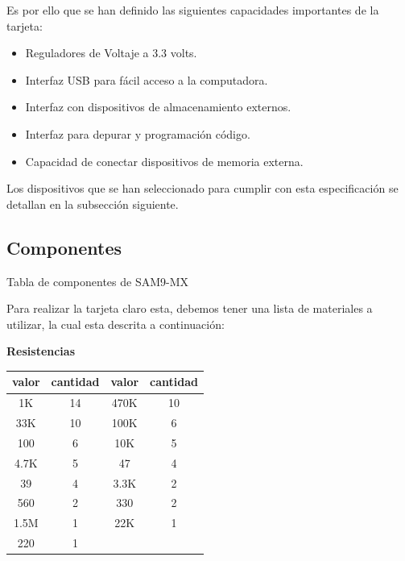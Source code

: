 Es por ello que se han definido las siguientes capacidades importantes de la tarjeta:

\begin{itemize}

\item Reguladores de Voltaje a 3.3 volts.
\item Interfaz USB para f\'acil acceso a la computadora.
\item Interfaz con dispositivos de almacenamiento externos.
\item Interfaz para depurar y programaci\'on código.
\item Capacidad de conectar dispositivos de memoria externa.

\end{itemize}

Los dispositivos que se han seleccionado para cumplir con esta especificaci\'on se detallan en la subsecci\'on siguiente.

\subsection{Componentes}


Tabla de componentes de SAM9-MX

Para realizar la tarjeta claro esta, debemos tener una lista de materiales a utilizar, la cual esta descrita a continuaci\'on:\medskip

\textbf{Resistencias}

\begin{center}
\begin{tabular}{|c|c|c|c|}
\hline
\hline
\normalsize valor & \normalsize cantidad & \normalsize valor & \normalsize cantidad\\
\hline
\normalsize 1K & \normalsize 14 & \normalsize 470K & \normalsize 10\\
\hline
\normalsize 33K & \normalsize 10 & \normalsize 100K & \normalsize 6\\
\hline
\normalsize 100 & \normalsize 6 & \normalsize 10K & \normalsize 5\\
\hline
\normalsize 4.7K & \normalsize 5 & \normalsize 47 & \normalsize 4\\
\hline
\normalsize 39 & \normalsize 4 & \normalsize 3.3K & \normalsize 2\\
\hline
\normalsize 560 & \normalsize 2 & \normalsize 330 & \normalsize 2\\
\hline
\normalsize 1.5M & \normalsize 1 & \normalsize 22K & \normalsize 1\\
\hline
\normalsize 220 & \normalsize 1 & \normalsize  & \normalsize \\
\hline
\end{tabular}
\end{center}

